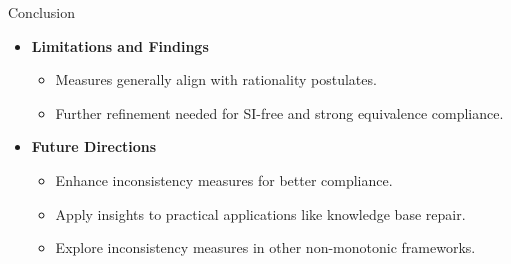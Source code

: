 \begin{frame}{Conclusion}
    \begin{itemize}
        \item \textbf{Limitations and Findings}
              \begin{itemize}
                  \item Measures generally align with rationality postulates.
                  \item Further refinement needed for SI-free and strong equivalence compliance.
              \end{itemize}
        \item \textbf{Future Directions}
              \begin{itemize}
                  \item Enhance inconsistency measures for better compliance.
                  \item Apply insights to practical applications like knowledge base repair.
                  \item Explore inconsistency measures in other non-monotonic frameworks.
              \end{itemize}
    \end{itemize}
\end{frame}

